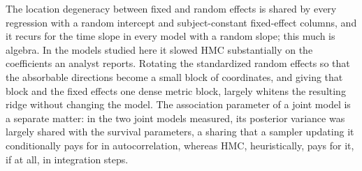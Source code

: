 The location degeneracy between fixed and random effects is shared by
every regression with a random intercept and subject-constant fixed-effect
columns, and it recurs for the time slope in every model with a random
slope; this much is algebra. In the models studied here it slowed HMC
substantially on the coefficients an analyst reports. Rotating the
standardized random effects so that the absorbable directions become a
small block of coordinates, and giving that block and the fixed effects
one dense metric block, largely whitens the resulting ridge without
changing the model. The association parameter of a joint model is a
separate matter: in the two joint models measured, its posterior variance
was largely shared with the survival parameters, a sharing that a
sampler updating it conditionally pays for in autocorrelation, whereas HMC,
heuristically, pays for it, if at all, in integration steps.
